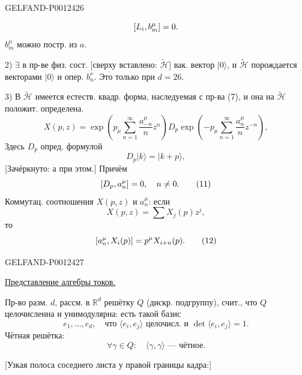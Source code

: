 \begin{GelfandAdjacentEvidence}{GELFAND-P001242}{6}

\begin{equation*}
\relax [L_i,b_m^\mu]=0.
\end{equation*}
$b_m^\mu$ можно постр. из $a$.

2) $\exists$ в пр-ве физ. сост. [сверху вставлено: $\widetilde{\mathcal H}$] вак. вектор $|0\rangle$,
и $\widetilde{\mathcal H}$ порождается векторами $|0\rangle$ и опер. $b_n^\nu$.
Это только при \underline{\underline{$d=26$}}.

3) В $\widetilde{\mathcal H}$ имеется естеств. квадр. форма, наследуемая с пр-ва (7), и она на $\widetilde{\mathcal H}$ положит. определена.
\begin{equation*}
X(p,z)=\exp\left(p_\mu\sum_{n=1}^{\infty}\frac{a_{-n}^\mu}{n}z^n\right)
D_p\exp\left(-p_\mu\sum_{n=1}^{\infty}\frac{a_n^\mu}{n}z^{-n}\right),\tag{9}
\end{equation*}
Здесь $D_p$ опред. формулой
\begin{equation*}
D_p|k\rangle=|k+p\rangle,\tag{10}
\end{equation*}
[Зачёркнуто: а при этом.] Причём
\begin{equation*}
\relax [D_p,a_n^\mu]=0,\quad n\ne0.\tag{11}
\end{equation*}
Коммутац. соотношения $X(p,z)$ и $a_n^\mu$: если
\begin{equation*}
X(p,z)=\sum X_j(p)z^j,
\end{equation*}
то
\begin{equation*}
\relax [a_n^\mu,X_i(p)]=p^\mu X_{i+n}(p).\tag{12}
\end{equation*}
\end{GelfandAdjacentEvidence}
\begin{GelfandAdjacentEvidence}{GELFAND-P001242}{7}


\underline{Представление алгебры токов.}

Пр-во разм. $d$, рассм. в $\mathbb R^d$ решётку $Q$ (дискр. подгруппу), счит., что $Q$ целочисленна и унимодулярна: есть такой базис
\begin{equation*}
e_1,\ldots,e_d,\quad\text{что }\langle e_i,e_j\rangle\text{ целочисл. и }\det\langle e_i,e_j\rangle=1.\tag{13}
\end{equation*}
Чётная решётка:
\begin{equation*}
\forall\gamma\in Q:\quad\langle\gamma,\gamma\rangle\text{ — чётное}.\tag{14}
\end{equation*}

[Узкая полоса соседнего листа у правой границы кадра:] 
\end{GelfandAdjacentEvidence}




